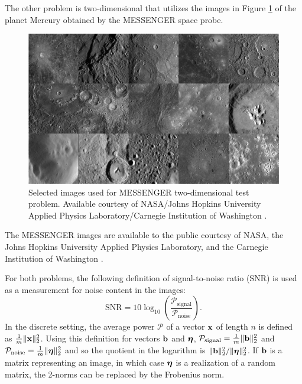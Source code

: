 \documentclass[12pt]{article}
\begin{document}
\noindent The other problem is two-dimensional that utilizes the images in Figure \ref{fig:MESSENGER True} of the planet Mercury obtained by the MESSENGER space probe. 

\begin{figure}[ht]
\includegraphics[scale=0.36]{Figures/MESSENGER}
\caption{Selected images used for MESSENGER two-dimensional test problem. Available courtesy of NASA/Johns  Hopkins  University  Applied  Physics  Laboratory/Carnegie Institution of Washington \cite{MESSENGER}.}
\label{fig:MESSENGER True}
\end{figure}

\noindent The MESSENGER images are available to the public courtesy of NASA, the Johns Hopkins University Applied Physics Laboratory, and the Carnegie Institution of Washington \cite{MESSENGER}. \par
For both problems, the following definition of signal-to-noise ratio (SNR) is used as a measurement for noise content in the images:
\begin{equation}
\label{eq:SNR}
\text{SNR} = 10\log_{10}\left(\frac{\mathcal{P}_{\text{signal}}}{\mathcal{P}_{\text{noise}}}\right).
\end{equation}
In the discrete setting, the average power $\mathcal{P}$ of a vector $\mathbf{x}$ of length $n$ is defined as $\frac{1}{m}\|\mathbf{x}\|^2_2$. Using this definition for vectors $\mathbf{b}$ and $\bm{\eta}$, $\mathcal{P}_{\text{signal}} = \frac{1}{m}\|\mathbf{b}\|^2_2$ and $\mathcal{P}_{\text{noise}} = \frac{1}{m}\|\bm{\eta}\|^2_2$ and so the quotient in the logarithm is $\|\mathbf{b}\|_2^2/\|\bm{\eta}\|_2^2$. If $\mathbf{b}$ is a matrix representing an image, in which case $\bm{\eta}$ is a realization of a random matrix, the 2-norms can be replaced by the Frobenius norm.
\end{document}
